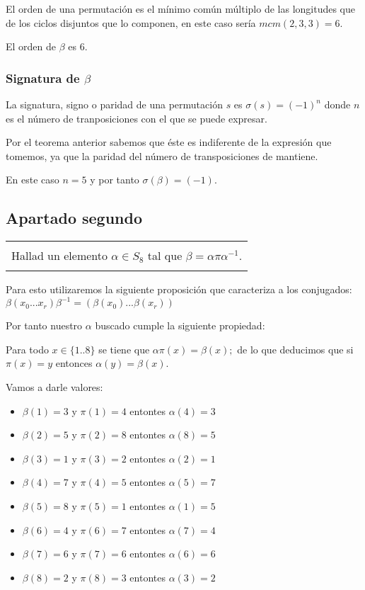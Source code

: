 \documentclass[12pt]{article}
\newenvironment{micaja}
{
    \begin{center}
    \begin{tabular}{|p{0.9\textwidth}|}
    \hline\\
    }   
    {   
    \\\\\hline
    \end{tabular} 
    \end{center}
    }
\begin{document}
El orden de una permutación es el mínimo común múltiplo de las longitudes que de los ciclos disjuntos que lo componen, en este caso sería $mcm(2,3,3)=6.$

El orden de $\beta$ es 6.

\subsubsection*{Signatura de $\beta$}

La signatura, signo o paridad de una permutación $s$ es $\sigma(s) = (-1)^n$ donde $n$ es el número de tranposiciones con el que se puede expresar.

Por el teorema anterior sabemos que éste es indiferente de la expresión  que tomemos, ya que la paridad del número de transposiciones de mantiene.

En este caso $n=5$ y por tanto $\sigma(\beta) = (-1).$

\subsection{Apartado segundo}
\begin{micaja}
Hallad un elemento $\alpha  \in S_8$ tal que $\beta = \alpha \pi \alpha^{-1}.$
\end{micaja}
Para esto utilizaremos la siguiente proposición que caracteriza a los conjugados: $\beta (x_0 ... x_r) \beta^{-1} = ( \beta (x_0)... \beta(x_r))$

Por tanto nuestro $\alpha$ buscado cumple la siguiente propiedad:

Para todo $x \in \{1..8\}$ se tiene que $\alpha \pi (x) = \beta(x);$ de lo que deducimos que si $\pi(x)=y$ entonces $\alpha(y) = \beta(x).$

Vamos a darle valores:
\begin{itemize}
\item $\beta(1) = 3$ y $\pi(1)=4$ entontes $\alpha(4)=3$
\item $\beta(2) = 5$ y $\pi(2)=8$ entontes $\alpha(8)=5$
\item $\beta(3) = 1$ y $\pi(3)=2$ entontes $\alpha(2)=1$
\item $\beta(4) = 7$ y $\pi(4)=5$ entontes $\alpha(5)=7$
\item $\beta(5) = 8$ y $\pi(5)=1$ entontes $\alpha(1)=5$
\item $\beta(6) = 4$ y $\pi(6)=7$ entontes $\alpha(7)=4$
\item $\beta(7) = 6$ y $\pi(7)=6$ entontes $\alpha(6)=6$
\item $\beta(8) = 2$ y $\pi(8)=3$ entontes $\alpha(3)=2$
\end{itemize}
\end{document}
